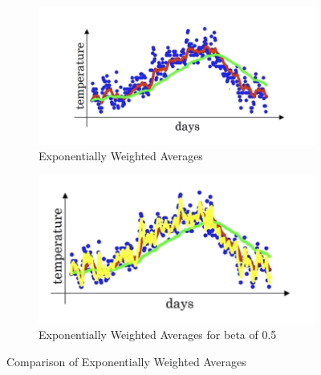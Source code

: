 \documentclass[letterpaper,12pt,notitlepage,twoside]{report}
\begin{document}
\begin{figure}[h]
    \centering
    \begin{subfigure}[b]{0.45\textwidth}
        \centering
        \includegraphics[width=\textwidth]{Images/Exponentially Weighted Averages.png}
        \caption{Exponentially Weighted Averages}
        \label{fig:19}
    \end{subfigure}
    \hfill
    \begin{subfigure}[b]{0.45\textwidth}
        \centering
        \includegraphics[width=\textwidth]{Images/EWA for beta=0.5.png}
        \caption{Exponentially Weighted Averages for beta of 0.5}
        \label{fig:20}
    \end{subfigure}
    \caption{Comparison of Exponentially Weighted Averages}
    \label{fig:side_by_side}
\end{figure}
\FloatBarrier
\end{document}
